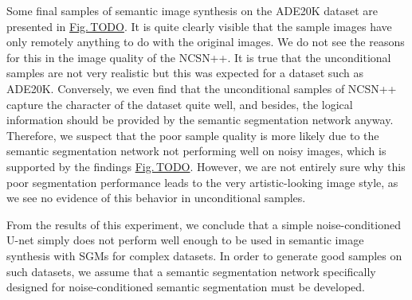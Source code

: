 Some final samples of semantic image synthesis on the ADE20K dataset are presented in \hyperref[fig:]{Fig.\,TODO}. It is quite clearly visible that the sample images have only remotely anything to do with the original images. We do not see the reasons for this in the image quality of the NCSN++. It is true that the unconditional samples are not very realistic but this was expected for a dataset such as ADE20K. Conversely, we even find that the unconditional samples of NCSN++ capture the character of the dataset quite well, and besides, the logical information should be provided by the semantic segmentation network anyway. Therefore, we suspect that the poor sample quality is more likely due to the semantic segmentation network not performing well on noisy images, which is supported by the findings \hyperref[fig:]{Fig.\,TODO}. However, we are not entirely sure why this poor segmentation performance leads to the very artistic-looking image style, as we see no evidence of this behavior in unconditional samples.

From the results of this experiment, we conclude that a simple noise-conditioned U-net simply does not perform well enough to be used in semantic image synthesis with SGMs for complex datasets. In order to generate good samples on such datasets, we assume that a semantic segmentation network specifically designed for noise-conditioned semantic segmentation must be developed.

